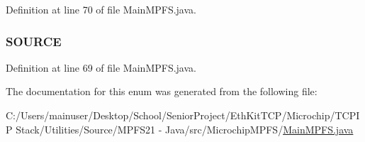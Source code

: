Definition at line 70 of file Main\+M\+P\+F\+S.\+java.

\hypertarget{enum_microchip_m_p_f_s_1_1_main_m_p_f_s_1_1_d_i_r_e_c_t_o_r_y___o_p_t_i_o_n_a5d4075dc93e74f488fcf26e40f220629}{}
\subsubsection[{S\+O\+U\+R\+C\+E}]{\setlength{\rightskip}{0pt plus 5cm}S\+O\+U\+R\+C\+E}\label{enum_microchip_m_p_f_s_1_1_main_m_p_f_s_1_1_d_i_r_e_c_t_o_r_y___o_p_t_i_o_n_a5d4075dc93e74f488fcf26e40f220629}


Definition at line 69 of file Main\+M\+P\+F\+S.\+java.



The documentation for this enum was generated from the following file\+:\begin{DoxyCompactItemize}
\item 
C\+:/\+Users/mainuser/\+Desktop/\+School/\+Senior\+Project/\+Eth\+Kit\+T\+C\+P/\+Microchip/\+T\+C\+P\+I\+P Stack/\+Utilities/\+Source/\+M\+P\+F\+S21 -\/ Java/src/\+Microchip\+M\+P\+F\+S/\hyperlink{_main_m_p_f_s_8java}{Main\+M\+P\+F\+S.\+java}\end{DoxyCompactItemize}
